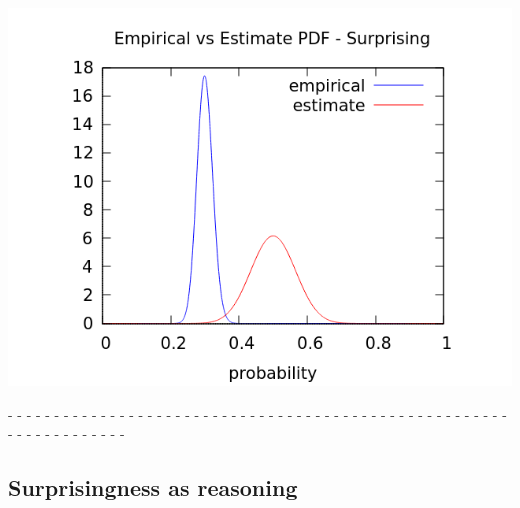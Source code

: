 \documentclass[aspectratio=169]{beamer}
\begin{document}
\begin{frame}
  \begin{center}
    \includegraphics[scale=0.6]{images/surprising.png}
  \end{center}

  - - - - - - - - - - - - - - - - - - - - - - - - - - - - - - - - - -
  - - - - - - - - - - - - - - - - - - - - - - - - - - - - - - - - -\\[0.1cm]

\end{frame}

\subsection{Surprisingness as reasoning}
\end{document}
